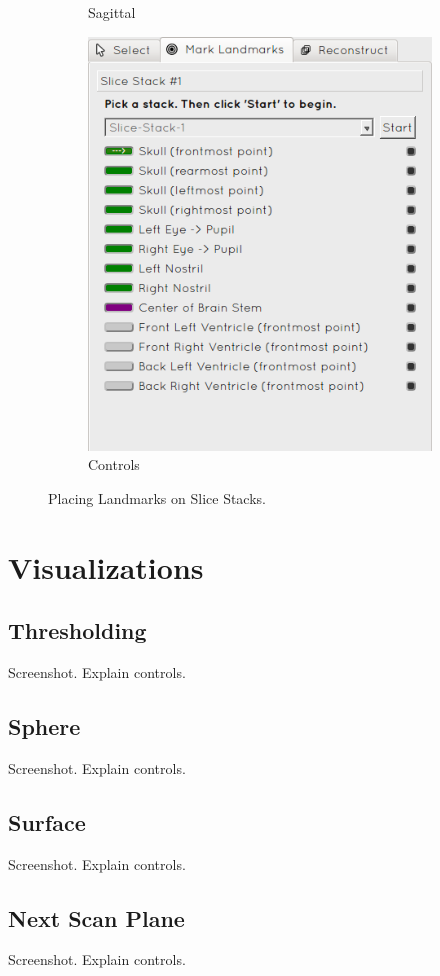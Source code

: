 \begin{figure}[H]
\begin{subfigure}[b]{0.358\textwidth}
    \caption*{Sagittal}
    \label{fig:reconstructionsagittal}
  \end{subfigure}%
  \begin{subfigure}[b]{0.283\textwidth}
    \includegraphics[width=\textwidth]{images/reconstruction/controls.png}
    \caption*{Controls}
    \label{fig:reconstructioncontrols}
  \end{subfigure}
  \caption{Placing Landmarks on Slice Stacks.}\label{fig:reconstructionlandmarks}
\end{figure}

\clearpage
\section{Visualizations}\label{implementation:visualizations}

\subsection{Thresholding}\label{implementation:thresholding}
Screenshot. Explain controls.

\subsection{Sphere}\label{implementation:sphere}
Screenshot. Explain controls.

\subsection{Surface}\label{implementation:surface}
Screenshot. Explain controls.

\subsection{Next Scan Plane}\label{implementation:nextscanplane}
Screenshot. Explain controls.